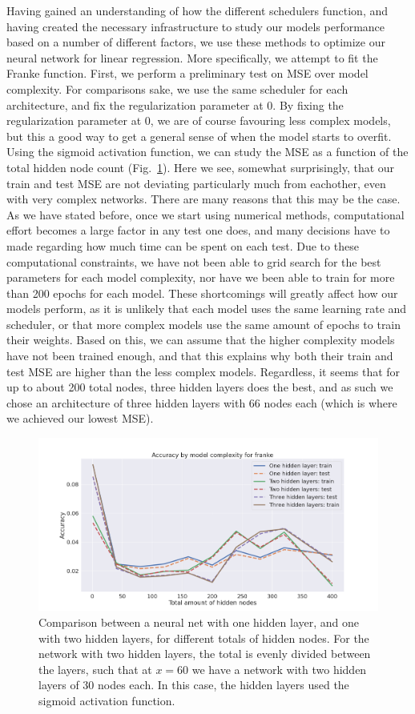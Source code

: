 \documentclass[onecolumn,10pt,cleanfoot]{asme2ej}
\begin{document}
Having gained an understanding of how the different schedulers function, and having created the necessary infrastructure to study our models performance based on a number of different factors, we use these methods to optimize our neural network for linear regression. More specifically, we attempt to fit the Franke function. First, we perform a preliminary test on MSE over model complexity. For comparisons sake, we use the same scheduler for each architecture, and fix the regularization parameter at 0. By fixing the regularization parameter at 0, we are of course favouring less complex models, but this a good way to get a general sense of when the model starts to overfit. Using the sigmoid activation function, we can study the MSE as a function of the total hidden node count (Fig.~\ref{msebymodelfranke}). Here we see, somewhat surprisingly, that our train and test MSE are not deviating particularly much from eachother, even with very complex networks. There are many reasons that this may be the case. As we have stated before, once we start using numerical methods, computational effort becomes a large factor in any test one does, and many decisions have to made regarding how much time can be spent on each test. Due to these computational constraints, we have not been able to grid search for the best parameters for each model complexity, nor have we been able to train for more than 200 epochs for each model. These shortcomings will greatly affect how our models perform, as it is unlikely that each model uses the same learning rate and scheduler, or that more complex models use the same amount of epochs to train their weights. Based on this, we can assume that the higher complexity models have not been trained enough, and that this explains why both their train and test MSE are higher than the less complex models. Regardless, it seems that for up to about 200 total nodes, three hidden layers does the best, and as such we chose an architecture of three hidden layers with 66 nodes each (which is where we achieved our lowest MSE).

\begin{figure}[h]
\centerline{\includegraphics[width=6in]{figure/msebymodelfranke.png}}
\caption{Comparison between a neural net with one hidden layer, and one with two hidden layers, for different totals of hidden nodes. For the network with two hidden layers, the total is evenly divided between the layers, such that at $x = 60$ we have a network with two hidden layers of 30 nodes each. In this case, the hidden layers used the sigmoid activation function.}
\label{msebymodelfranke}
\end{figure}
\end{document}
